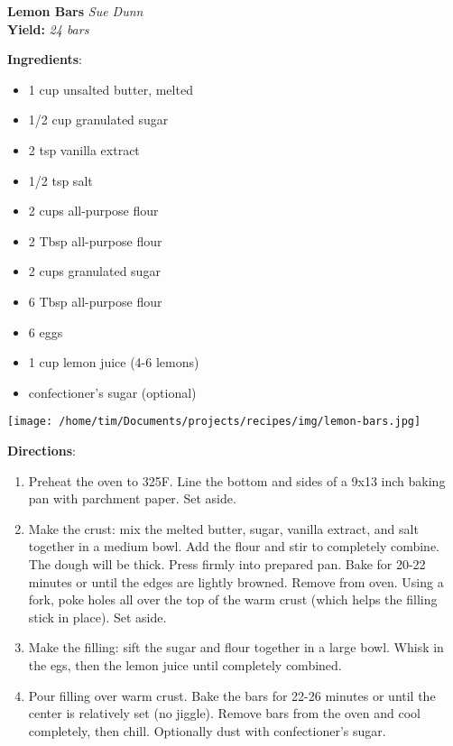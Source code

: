 \documentclass[11pt, twoside, openany]{book}
\begin{document}
\noindent\begin{minipage}[t]{\linewidth}%
{\Large\textbf{Lemon Bars}} \label{lemon-bars}\hfill\textit{Sue Dunn}\\
\textbf{Yield:} \textit{24 bars}\\
\noindent\begin{minipage}[t]{0.78\linewidth}%
\textbf{Ingredients}:\vspace{-3mm}
\begin{multicols}{2}
\begin{itemize}\setlength\itemsep{-1mm}
\item 1 cup unsalted butter, melted
\item 1/2 cup granulated sugar
\item 2 tsp vanilla extract
\item 1/2 tsp salt
\item 2 cups all-purpose flour
\item 2 Tbsp all-purpose flour
\item 2 cups granulated sugar
\item 6 Tbsp all-purpose flour
\item 6 eggs
\item 1 cup lemon juice (4-6 lemons)
\item confectioner's sugar (optional)
\end{itemize}
\end{multicols}
\end{minipage}
\noindent\begin{minipage}[t]{0.18\linewidth}
\centering \strut\vspace*{-\baselineskip}\newline
\texttt{[image: /home/tim/Documents/projects/recipes/img/lemon-bars.jpg]}\\
\end{minipage}\vspace{3mm}
\textbf{Directions}:
\vspace{-3mm}\begin{enumerate}\setlength\itemsep{-1mm}
\item Preheat the oven to 325F. Line the bottom and sides of a 9x13 inch baking pan with parchment paper. Set aside.
\item Make the crust: mix the melted butter, sugar, vanilla extract, and salt together in a medium bowl. Add the flour and stir to completely combine. The dough will be thick. Press firmly into prepared pan. Bake for 20-22 minutes or until the edges are lightly browned. Remove from oven. Using a fork, poke holes all over the top of the warm crust (which helps the filling stick in place). Set aside.
\item Make the filling: sift the sugar and flour together in a large bowl. Whisk in the egs, then the lemon juice until completely combined.
\item Pour filling over warm crust. Bake the bars for 22-26 minutes or until the center is relatively set (no jiggle). Remove bars from the oven and cool completely, then chill. Optionally dust with confectioner's sugar.
\end{enumerate}
\end{minipage}\vspace{8mm}
\end{document}
